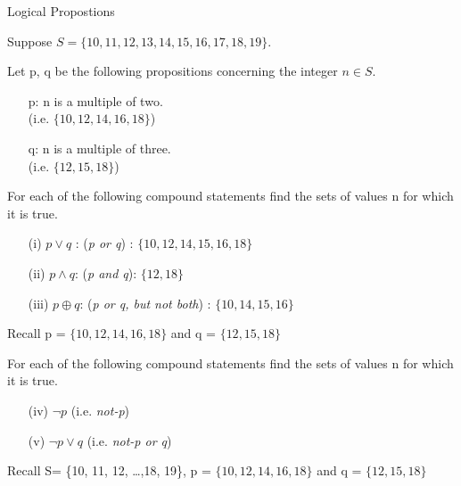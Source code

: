 \documentclass{beamer}
\begin{document}
\begin{frame}
{Logical Propostions}

Suppose $S = \{10,11,12,13,14,15,16,17,18,19\}$.

Let p, q be the following propositions concerning the integer $n \in S$.
\begin{itemize}
\item[p:] n is a multiple of two. \\(i.e. $\{10,12,14,16,18\}$)
\item[q:] n is a multiple of three. \\(i.e. $\{12,15,18\}$)
\end{itemize}

For each of the following compound statements find the sets of values n for which it is true. 

\begin{itemize}
\item[(i)] $p \vee q$ : (\textit{p or q}) :  $\{10, 12, 14, 15, 16, 18\}$ 
\item[(ii)] $p \wedge q$: (\textit{p and q}):  $\{12, 18\}$
\item[(iii)] $ p \oplus q$: (\textit{p or q, but not both}) :  $\{10, 14, 15, 16\}$
\end{itemize}

Recall p = $\{10,12,14,16,18\}$  and q = $\{12,15,18\}$


For each of the following compound statements find the sets of values n for which it is true. %
\begin{itemize}
\item[(iv)] $\neg p $  (i.e. \textit{not-p}) %
\item[(v)] $\neg p \vee q$  (i.e. \textit{not-p or q}) %
\end{itemize}

Recall S= \{10, 11, 12, \ldots ,18, 19\}, p = $\{10,12,14,16,18\}$  and q = $\{12,15,18\}$


\end{frame}
\end{document}
